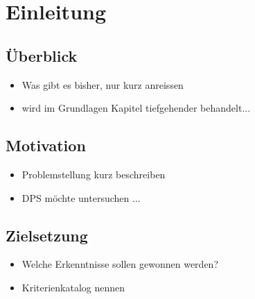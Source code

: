 \chapter{Einleitung}

\section{\"Uberblick}
\begin{itemize}
  \item Was gibt es bisher, nur kurz anreissen
  \item wird im Grundlagen Kapitel tiefgehender behandelt...
\end{itemize}

\section{Motivation}
\begin{itemize}
  \item Problemstellung kurz beschreiben
  \item DPS m\"ochte untersuchen ...
\end{itemize}

\section{Zielsetzung}
\begin{itemize}
  \item Welche Erkenntnisse sollen gewonnen werden?
  \item Kriterienkatalog nennen
\end{itemize}
